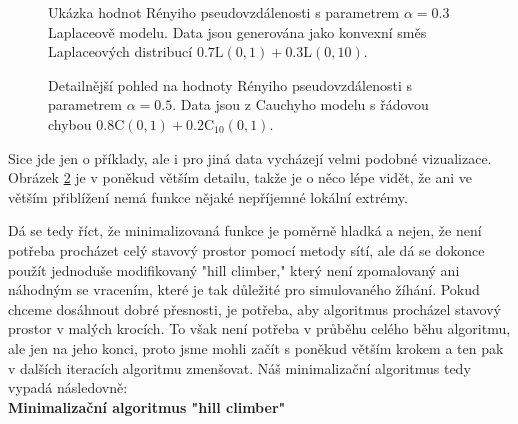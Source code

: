 \begin{figure}[htb!]
	\begin{center}
		\caption{Ukázka hodnot Rényiho pseudovzdálenosti s parametrem $\alpha = 0.3$ Laplaceově modelu. Data jsou generována jako konvexní směs Laplaceových distribucí $0.7\mathrm{L}(0,1) + 0.3 \mathrm{L}(0,10)$.}
		\label{fig-distanceL}
	\end{center}
\end{figure}

\begin{figure}[htb!]
	\begin{center}
		\caption{Detailnější pohled na hodnoty Rényiho pseudovzdálenosti s parametrem $\alpha = 0.5$. Data jsou z Cauchyho modelu s řádovou chybou $0.8\mathrm{C}(0,1) + 0.2 \mathrm{C}_{10}(0,1)$.}
		\label{fig-distanceC}
	\end{center}
\end{figure}

Sice jde jen o příklady, ale i pro jiná data vycházejí velmi podobné vizualizace. Obrázek \ref{fig-distanceC} je v poněkud větším detailu, takže je o něco lépe vidět, že ani ve větším přiblížení nemá funkce nějaké nepříjemné lokální extrémy. 

Dá se tedy říct, že minimalizovaná funkce je poměrně hladká a nejen, že není potřeba procházet celý stavový prostor pomocí metody sítí, ale dá se dokonce použít jednoduše modifikovaný "hill climber," který není zpomalovaný ani náhodným se vracením, které je tak důležité pro simulovaného žíhání. Pokud chceme dosáhnout dobré přesnosti, je potřeba, aby algoritmus procházel stavový prostor v malých krocích. To však není potřeba v průběhu celého běhu algoritmu, ale jen na jeho konci, proto jsme mohli začít s poněkud větším krokem a ten pak v dalších iteracích algoritmu zmenšovat. Náš minimalizační algoritmus tedy vypadá následovně: 
\vspace{11 pt} \\
\textbf{Minimalizační algoritmus "hill climber"}

